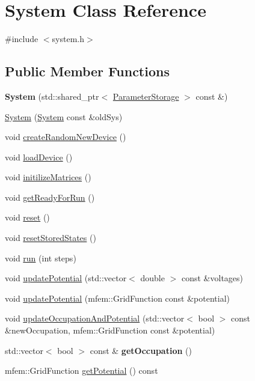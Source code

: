 \hypertarget{classSystem}{}\section{System Class Reference}
\label{classSystem}


{\ttfamily \#include $<$system.\+h$>$}

\subsection*{Public Member Functions}
\begin{DoxyCompactItemize}
\item 
\mbox{\label{classSystem_afb9e8e41153aa000fee8976c4f254682}} 
{\bfseries System} (std\+::shared\+\_\+ptr$<$ \hyperlink{classParameterStorage}{Parameter\+Storage} $>$ const \&)
\item 
\hyperlink{classSystem_afe81cf1082ba164e244acfb72735b753}{System} (\hyperlink{classSystem}{System} const \&old\+Sys)
\item 
void \hyperlink{classSystem_a5ce3d5c7024ac817ab218b65d96ed1eb}{create\+Random\+New\+Device} ()
\item 
void \hyperlink{classSystem_abe7a2b35b346ac9d823b5431d277d391}{load\+Device} ()
\item 
void \hyperlink{classSystem_a4fddf46176e76cc8d9e1ef91d38d82be}{initilize\+Matrices} ()
\item 
void \hyperlink{classSystem_a943bc42d8dc42ae1aaf1a5798ce723b8}{get\+Ready\+For\+Run} ()
\item 
void \hyperlink{classSystem_a2029214f3faeefd335b67b2264b61fe5}{reset} ()
\item 
void \hyperlink{classSystem_ab8fd982f98b67cb94f9cb0085b440751}{reset\+Stored\+States} ()
\item 
void \hyperlink{classSystem_a166f8dc2f77ff0ff2df9b25f8740a134}{run} (int steps)
\item 
void \hyperlink{classSystem_a398b2539956dc5c456dff4bbe24eb1ba}{update\+Potential} (std\+::vector$<$ double $>$ const \&voltages)
\item 
void \hyperlink{classSystem_a3d2943951e8fd2aece2c27065ed16e3d}{update\+Potential} (mfem\+::\+Grid\+Function const \&potential)
\item 
void \hyperlink{classSystem_adabb9bdb6516b565f63345ea74a10de7}{update\+Occupation\+And\+Potential} (std\+::vector$<$ bool $>$ const \&new\+Occupation, mfem\+::\+Grid\+Function const \&potential)
\item 
\mbox{\label{classSystem_a5833eb4c881e1495f1e24456e9b225ad}} 
std\+::vector$<$ bool $>$ const  \& {\bfseries get\+Occupation} ()
\item 
mfem\+::\+Grid\+Function \hyperlink{classSystem_a8b1198a23ff52e2460fd605f727419c2}{get\+Potential} () const
\end{DoxyCompactItemize}
